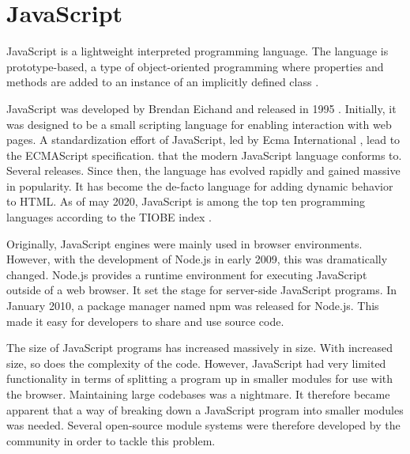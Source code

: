 \section{JavaScript}
JavaScript is a lightweight interpreted programming language. The language is prototype-based, a type of object-oriented programming where properties and methods are added to an instance of an implicitly defined class \cite{prototype-based-programming}.

JavaScript was developed by Brendan Eichand and released in 1995 \cite{javascript-original-release}. Initially, it was designed to be a small scripting language for enabling interaction with web pages. A standardization effort of JavaScript, led by Ecma International \cite{ecma-international}, lead to the ECMAScript specification.  that the modern JavaScript language conforms to. Several releases. Since then, the language has evolved rapidly and gained massive in popularity. It has become the de-facto language for adding dynamic behavior to HTML. As of may 2020, JavaScript is among the top ten programming languages according to the TIOBE index \cite{tiobe-index}.

Originally, JavaScript engines were mainly used in browser environments. However, with the development of Node.js in early 2009, this was dramatically changed. Node.js provides a runtime environment for executing JavaScript outside of a web browser. It set the stage for server-side JavaScript programs. In January 2010, a package manager named npm \cite{npm} was released for Node.js. This made it easy for developers to share and use source code.

The size of JavaScript programs has increased massively in size. With increased size, so does the complexity of the code. However, JavaScript had very limited functionality in terms of splitting a program up in smaller modules for use with the browser. Maintaining large codebases was a nightmare. It therefore became apparent that a way of breaking down a JavaScript program into smaller modules was needed. Several open-source module systems were therefore developed by the community in order to tackle this problem.

